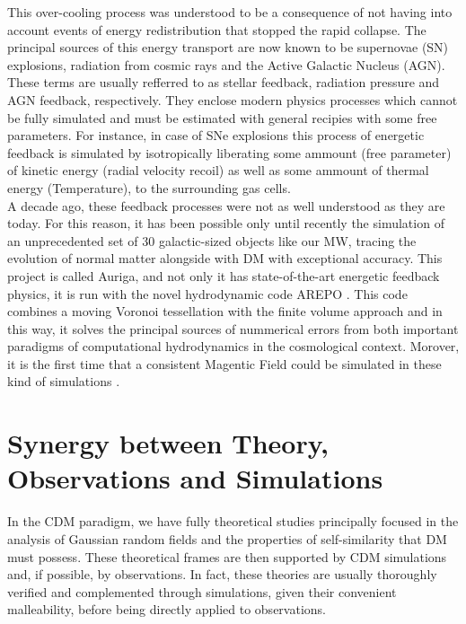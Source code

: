 This over-cooling process was understood to be a consequence of not having into account events of energy redistribution that stopped the rapid collapse. The principal sources of this energy transport are now known to be supernovae (SN) explosions, radiation from cosmic rays and the Active Galactic Nucleus (AGN). These terms are usually refferred to as stellar feedback, radiation pressure and AGN feedback, respectively. They enclose modern physics processes which cannot be fully simulated and must be estimated with general recipies with some free parameters. For instance, in case of SNe explosions this process of energetic feedback is simulated by isotropically liberating some ammount (free parameter) of kinetic energy (radial velocity recoil) as well as some ammount of thermal energy (Temperature), to the surrounding gas cells. \\

 A decade ago, these feedback processes were not as well understood as they are today. For this reason, it has been possible only until recently the simulation of an unprecedented set of 30 galactic-sized objects like our MW, tracing the evolution of normal matter alongside with DM with exceptional accuracy. This project is called Auriga, \cite{auriga} and not only it has state-of-the-art energetic feedback physics, it is run with the novel hydrodynamic code AREPO
\cite{arepo}. This code combines a moving Voronoi tessellation with the
finite volume approach and in this way, it solves the principal sources of nummerical errors from both important paradigms of computational hydrodynamics in the cosmological context. Morover, it is the first time that a consistent Magentic Field could be simulated in these kind of simulations \cite{Pakmor_et_al._2017}.\\
 

\section{Synergy between Theory, Observations and Simulations }
In the CDM paradigm, we have fully theoretical studies \cite{Bardeen_1986,Schechter_1976} principally focused in the analysis of Gaussian random fields and the properties of self-similarity that DM must possess. 
These theoretical frames are then supported by CDM simulations and, if possible, by observations. 
In fact, these theories are usually thoroughly verified and complemented through simulations, given their convenient malleability, before being directly applied to observations.\\%

